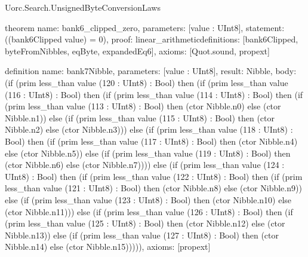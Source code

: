 \begin{lexlean}{Uorc.Search.UnsignedByteConversionLaws}
\begin{semanticmodule}
theorem{
  name: bank6_clipped_zero,
  parameters: [value : UInt8],
  statement: ((bank6Clipped value) = 0),
  proof: linear_arithmetic{definitions: [bank6Clipped, byteFromNibbles, eqByte, expandedEq6]},
  axioms: [Quot.sound, propext]
}

definition{
  name: bank7Nibble,
  parameters: [value : UInt8],
  result: Nibble,
  body: (if (prim less_than value (120 : UInt8) : Bool) then (if (prim less_than value (116 : UInt8) : Bool) then (if (prim less_than value (114 : UInt8) : Bool) then (if (prim less_than value (113 : UInt8) : Bool) then (ctor Nibble.n0) else (ctor Nibble.n1)) else (if (prim less_than value (115 : UInt8) : Bool) then (ctor Nibble.n2) else (ctor Nibble.n3))) else (if (prim less_than value (118 : UInt8) : Bool) then (if (prim less_than value (117 : UInt8) : Bool) then (ctor Nibble.n4) else (ctor Nibble.n5)) else (if (prim less_than value (119 : UInt8) : Bool) then (ctor Nibble.n6) else (ctor Nibble.n7)))) else (if (prim less_than value (124 : UInt8) : Bool) then (if (prim less_than value (122 : UInt8) : Bool) then (if (prim less_than value (121 : UInt8) : Bool) then (ctor Nibble.n8) else (ctor Nibble.n9)) else (if (prim less_than value (123 : UInt8) : Bool) then (ctor Nibble.n10) else (ctor Nibble.n11))) else (if (prim less_than value (126 : UInt8) : Bool) then (if (prim less_than value (125 : UInt8) : Bool) then (ctor Nibble.n12) else (ctor Nibble.n13)) else (if (prim less_than value (127 : UInt8) : Bool) then (ctor Nibble.n14) else (ctor Nibble.n15))))),
  axioms: [propext]
}


\end{semanticmodule}
\end{lexlean}
